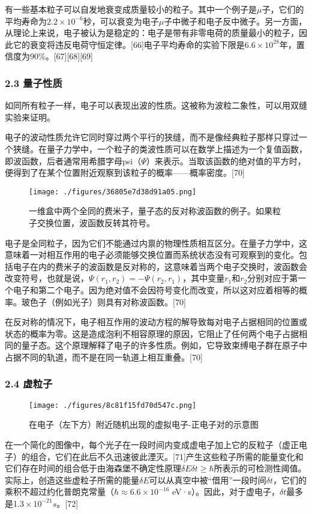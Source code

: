 有一些基本粒子可以自发地衰变成质量较小的粒子。其中一个例子是$\mu$子，它们的平均寿命为$2.2\times10^{-6}$秒，可以衰变为电子$\mu$子中微子和电子反中微子。另一方面，从理论上来说，电子被认为是稳定的：电子是带有非零电荷的质量最小的粒子，因此它的衰变将违反电荷守恒定律。[66]电子平均寿命的实验下限是$6.6\times10^{28}$年，置信度为90\%。[67][68][69]
\subsubsection{2.3 量子性质}
如同所有粒子一样，电子可以表现出波的性质。这被称为波粒二象性，可以用双缝实验来证明。

电子的波动性质允许它同时穿过两个平行的狭缝，而不是像经典粒子那样只穿过一个狭缝。在量子力学中，一个粒子的类波性质可以在数学上描述为一个复值函数，即波函数，后者通常用希腊字母psi（$\Psi$）来表示。当取该函数的绝对值的平方时，便得到了在某个位置附近观察到该粒子的概率——概率密度。[70]
\begin{figure}[ht]
\centering
\texttt{[image: ./figures/36805e7d38d91a05.png]}
\caption{一维盒中两个全同的费米子，量子态的反对称波函数的例子。如果粒子交换位置，波函数反转其符号。} \label{fig_DZ_6}
\end{figure}
电子是全同粒子，因为它们不能通过内禀的物理性质相互区分。在量子力学中，这意味着一对相互作用的电子必须能够交换位置而系统状态没有可观察到的变化。包括电子在内的费米子的波函数是反对称的，这意味着当两个电子交换时，波函数会改变符号，也就是说，$\Psi(r_1, r_2) = -\Psi(r_2, r_1)$，其中变量$r_1$和$r_2$分别对应于第一个电子和第二个电子。因为绝对值不会因符号变化而改变，所以这对应着相等的概率。玻色子（例如光子）则具有对称波函数。[70]

在反对称的情况下，电子相互作用的波动方程的解导致每对电子占据相同的位置或状态的概率为零。这是造成泡利不相容原理的原因，它阻止了任何两个电子占据相同的量子态。这个原理解释了电子的许多性质。例如，它导致束缚电子群在原子中占据不同的轨道，而不是在同一轨道上相互重叠。[70]
\subsubsection{2.4 虚粒子}
\begin{figure}[ht]
\centering
\texttt{[image: ./figures/8c81f15fd70d547c.png]}
\caption{在电子（左下方）附近随机出现的虚拟电子-正电子对的示意图} \label{fig_DZ_7}
\end{figure}
在一个简化的图像中，每个光子在一段时间内变成虚电子加上它的反粒子（虚正电子）的组合，它们在此后不久迅速彼此湮灭。[71]产生这些粒子所需的能量变化和它们存在时间的组合低于由海森堡不确定性原理$\delta E \delta t \ge \hbar$所表示的可检测性阈值。实际上，创造这些虚粒子所需的能量$\delta E$可以从真空中被“借用”一段时间$\delta t$，它们的乘积不超过约化普朗克常量（$\hbar\approx 6.6\times10^{-16}$ eV·s）。因此，对于虚电子，$\delta t$最多是1.$3\times10^{-21} s$。[72]

